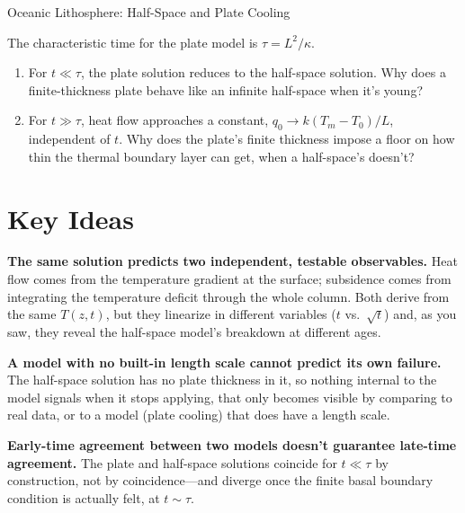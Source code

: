 \begin{activity}{Oceanic Lithosphere: Half-Space and Plate Cooling}
\begin{questions}
The characteristic time for the plate model is $\tau=L^2/\kappa$.

\begin{enumerate}[label=(\alph*)]
    \item For $t\ll\tau$, the plate solution reduces to the half-space solution. Why does a finite-thickness plate behave like an infinite half-space when it's young?
    \answerbox[2cm]

    \item For $t\gg\tau$, heat flow approaches a constant, $q_0\to k(T_m-T_0)/L$, independent of $t$. Why does the plate's finite thickness impose a floor on how thin the thermal boundary layer can get, when a half-space's doesn't?
    \answerbox[2.5cm]
\end{enumerate}

\end{questions}

\section*{Key Ideas}

\textbf{The same solution predicts two independent, testable observables.} Heat flow comes from the temperature gradient at the surface; subsidence comes from integrating the temperature deficit through the whole column. Both derive from the same $T(z,t)$, but they linearize in different variables ($t$ vs.\ $\sqrt t$) and, as you saw, they reveal the half-space model's breakdown at different ages.

\textbf{A model with no built-in length scale cannot predict its own failure.} The half-space solution has no plate thickness in it, so nothing internal to the model signals when it stops applying, that only becomes visible by comparing to real data, or to a model (plate cooling) that does have a length scale.

\textbf{Early-time agreement between two models doesn't guarantee late-time agreement.} The plate and half-space solutions coincide for $t\ll\tau$ by construction, not by coincidence---and diverge once the finite basal boundary condition is actually felt, at $t\sim\tau$.

\end{activity}
